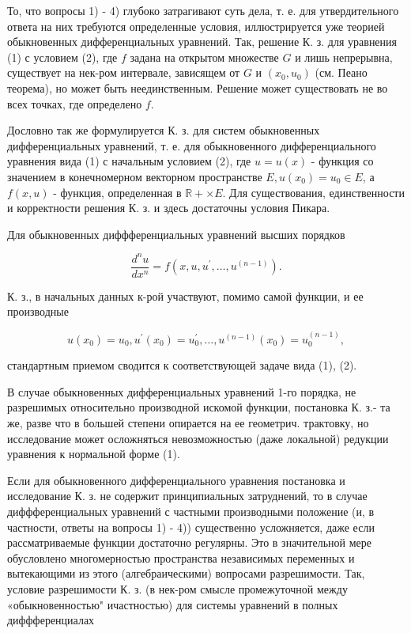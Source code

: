 \documentclass[10pt]{article}
\begin{document}
То, что вопросы 1) - 4) глубоко затрагивают суть дела, т. е. для утвердительного ответа на них требуются определенные условия, иллюстрируется уже теорией обыкновенных дифференциальных уравнений. Так, решение К. з. для уравнения (1) с условием (2), где $f$ задана на открытом множестве $G$ и лишь непрерывна, существует на нек-ром интервале, зависящем от $G$ и $\left(x_{0}, u_{0}\right)$ (см. Пеано теорема), но может быть неединственным. Решение может существовать не во всех точках, где определено $f$.



Дословно так же формулируется К. з. для систем обыкновенных дифференциальных уравнений, т. е. для обыкновенного дифференциального уравнения вида (1) с начальным условием (2), где $u=u(x)$ - функция со значением в конечномерном векторном пространстве $E, u\left(x_{0}\right)=u_{0} \in E$, а $f(x, u)$ - функция, определенная в $\mathbb{R}+\times E$. Для существования, единственности и корректности решения К. з. и здесь достаточны условия Пикара.



Для обыкновенных диффференциальных уравнений высших порядков



\[

\frac{d^{n} u}{d x^{n}}=f\left(x, u, u^{\prime}, \ldots, u^{(n-1)}\right) .

\]



К. з., в начальных данных к-рой участвуют, помимо самой функции, и ее производные



\[

u\left(x_{0}\right)=u_{0}, u^{\prime}\left(x_{0}\right)=u_{0}^{\prime}, \ldots, u^{(n-1)}\left(x_{0}\right)=u_{0}^{(n-1)},

\]



стандартным приемом сводится к соответствующей задаче вида (1), (2).



В случае обыкновенных дифференциальных уравнений 1-го порядка, не разрешимых относительно производной искомой функции, постановка К. з.- та же, разве что в большей степени опирается на ее геометрич. трактовку, но исследование может осложняться невозможностью (даже локальной) редукции уравнения к нормальной форме (1).



Если для обыкновенного дифференциального уравнения постановка и исследование К. з. не содержит принципиальных затруднений, то в случае диффференциальных уравнений с частными производными положение (и, в частности, ответы на вопросы 1) - 4)) существенно усложняется, даже если рассматриваемые функции достаточно регулярны. Это в значительной мере обусловлено многомерностью пространства независимых переменных и вытекающими из этого (алгебраическими) вопросами разрешимости. Так, условие разрешимости К. з. (в нек-ром смысле промежуточной между «обыкновенностью" ичастностью) для системы уравнений в полных диффференциалах
\end{document}

